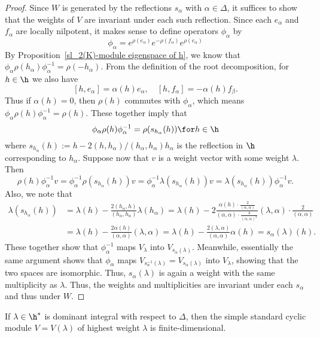 \begin{proof}
Since $W$ is generated by the reflections $s_\alpha$ with $\alpha\in\Delta$, it suffices to show that the weights of $V$ are invariant under each such reflection. Since each $e_\alpha$ and $f_\alpha$ are locally nilpotent, it makes sense to define operators $\phi_\alpha$ by
\[\phi_\alpha=e^{\rho(e_\alpha)}e^{-\rho(f_\alpha)}e^{\rho(e_\alpha)}\]
By Proposition~\ref{sl_2(K)-module eigenspace of h}, we know that $\phi_\alpha\rho(h_\alpha)\phi_\alpha^{-1}=\rho(-h_\alpha)$. From the definition of the root decomposition, for $h\in\h$ we also have
\[[h,e_\alpha]=\alpha(h)e_\alpha,\quad[h,f_\alpha]=-\alpha(h)f_\beta.\]
Thus if $\alpha(h)=0$, then $\rho(h)$ commutes with $\phi_\alpha$, which means $\phi_\alpha\rho(h)\phi_\alpha^{-1}=\rho(h)$. These together imply that
\[\phi_\alpha\rho(h)\phi_\alpha^{-1}=\rho(s_{h_\alpha}(h))\for h\in\h\]
where $s_{h_\alpha}(h):=h-2(h,h_\alpha)/(h_\alpha,h_\alpha)h_\alpha$ is the reflection in $\h$ corresponding to $h_\alpha$. Suppose now that $v$ is a weight vector with some weight $\lambda$. Then
\[\rho(h)\phi_\alpha^{-1}v=\phi_\alpha^{-1}\rho(s_{h_\alpha}(h))v=\phi_\alpha^{-1}\lambda(s_{h_\alpha}(h))v=\lambda(s_{h_\alpha}(h))\phi_\alpha^{-1}v.\]
Also, we note that
\begin{align*}
\lambda(s_{h_\alpha}(h))&=\lambda(h)-\frac{2(h_\alpha,h)}{(h_\alpha,h_\alpha)}\lambda(h_\alpha)=\lambda(h)-2\frac{\alpha(h)\cdot\frac{2}{(\alpha,\alpha)}}{(\alpha,\alpha)\cdot\frac{4}{(\alpha,\alpha)^2}}(\lambda,\alpha)\cdot\frac{2}{(\alpha,\alpha)}\\
&=\lambda(h)-\frac{2\alpha(h)}{(\alpha,\alpha)}(\lambda,\alpha)=\lambda(h)-\frac{2(\lambda,\alpha)}{(\alpha,\alpha)}\alpha(h)=s_\alpha(\lambda)(h).
\end{align*}
These together show that $\phi_\alpha^{-1}$ maps $V_\lambda$ into $V_{s_\alpha(\lambda)}$. Meanwhile, essentially the same argument shows that $\phi_\alpha$ maps $V_{s_\alpha^{-1}(\lambda)}=V_{s_\alpha(\lambda)}$ into $V_\lambda$, showing that the two spaces are isomorphic. Thus, $s_\alpha(\lambda)$ is again a weight with the same multiplicity as $\lambda$. Thus, the weights and multiplicities are invariant under each $s_\alpha$ and thus under $W$.
\end{proof}
\begin{theorem}\label{Lie algebra simple standard cyclic module finite-dim if weight dominant}
If $\lambda\in\h^*$ is dominant integral with respect to $\Delta$, then the simple standard cyclic module $V=V(\lambda)$ of highest weight $\lambda$ is finite-dimensional.
\end{theorem}
